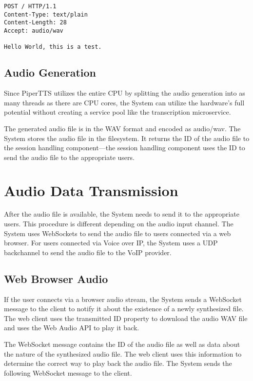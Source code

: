 \begin{verbatim}
POST / HTTP/1.1
Content-Type: text/plain
Content-Length: 28
Accept: audio/wav

Hello World, this is a test.

\end{verbatim}

\subsection{Audio Generation}

Since PiperTTS utilizes the entire CPU by splitting the audio generation into as many threads as there are CPU cores, 
the System can utilize the hardware's full potential without creating a service pool like the transcription 
microservice.

The generated audio file is in the WAV format and encoded as audio/wav. The System stores the audio file in the 
filesystem. It returns the ID of the audio file to the session handling component—the session handling component uses 
the ID to send the audio file to the appropriate users. 


\section{Audio Data Transmission}

After the audio file is available, the System needs to send it to the appropriate users. This procedure is different 
depending on the audio input channel. The System uses WebSockets to send the audio file to users connected via a web 
browser. For users connected via Voice over IP, the System uses a UDP backchannel to send the audio file to the VoIP 
provider.

\subsection{Web Browser Audio}

If the user connects via a browser audio stream, the System sends a WebSocket message to the client to notify it about 
the existence of a newly synthesized file. The web client uses the transmitted ID property to download the audio WAV 
file and uses the Web Audio API to play it back.

The WebSocket message contains the ID of the audio file as well as data about the nature of the synthesized audio file. 
The web client uses this information to determine the correct way to play back the audio file. The System sends the 
following WebSocket message to the client.

